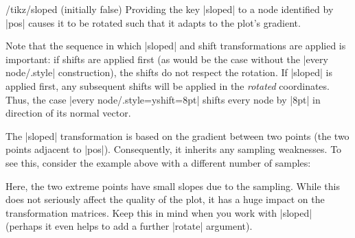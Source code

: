 {\begin{key}{/tikz/sloped (initially false)}
    Providing the \Tikz{} key |sloped| to a node identified by |pos| causes it
    to be rotated such that it adapts to the plot's gradient.
\pgfplotsexpensiveexample
\begin{codeexample}[]
\end{codeexample}
    Note that the sequence in which |sloped| and shift transformations are
    applied is important: if shifts are applied first (as would be the case
    without the |every node/.style| construction), the shifts do not respect
    the rotation. If |sloped| is applied first, any subsequent shifts will be
    applied in the \emph{rotated} coordinates. Thus, the case
    |every node/.style={yshift=8pt}| shifts every node by |8pt| in direction of
    its normal vector.

    The |sloped| transformation is based on the gradient between two points
    (the two points adjacent to |pos|). Consequently, it inherits any sampling
    weaknesses. To see this, consider the example above with a different number
    of samples:
\pgfplotsexpensiveexample
\begin{codeexample}[]
\end{codeexample}
    \noindent Here, the two extreme points have small slopes due to the
    sampling. While this does not seriously affect the quality of the plot, it
    has a huge impact on the transformation matrices. Keep this in mind when
    you work with |sloped| (perhaps it even helps to add a further |rotate|
    argument).
\end{key}

}
